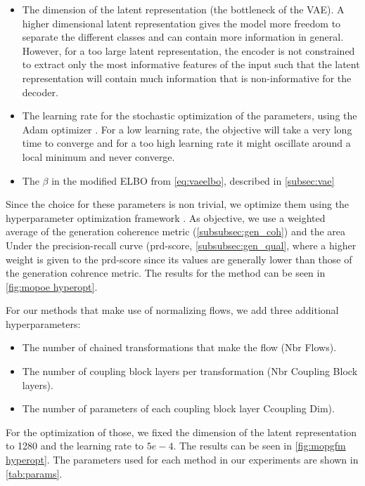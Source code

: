 \begin{itemize}
    \item The dimension of the latent representation (the bottleneck of the VAE).
    A higher dimensional latent representation gives the model more freedom to separate the different classes and can contain more information in general.
    However, for a too large latent representation, the encoder is not constrained to extract only the most informative features of the input such that the latent representation will contain much information that is non-informative for the decoder.
    \item The learning rate for the stochastic optimization of the parameters, using the Adam optimizer \citep{kingma_adam_2017}.
    For a low learning rate, the objective will take a very long time to converge and for a too high learning rate it might oscillate around a local minimum and never converge.
    \item The $\beta$ in the modified ELBO from \cref{eq:vaeelbo}, described in \cref{subsec:vae}
\end{itemize}

Since the choice for these parameters is non trivial, we optimize them using the hyperparameter optimization framework  \citep{akiba_optuna_2019}.
As objective, we use a weighted average of the generation coherence metric (\cref{subsubsec:gen_coh}) and the area Under the precision-recall curve (prd-score, \cref{subsubsec:gen_qual}, where a higher weight is given to the prd-score since its values are generally lower than those of the generation cohrence metric.
The results for the  method can be seen in \cref{fig:mopoe hyperopt}.

For our methods that make use of normalizing flows, we add three additional hyperparameters:
\begin{itemize}
    \item The number of chained transformations that make the flow (Nbr Flows).
    \item The number of coupling block layers per transformation (Nbr Coupling Block layers).
    \item The number of parameters of each coupling block layer Ccoupling Dim).
\end{itemize}

For the optimization of those, we fixed the dimension of the latent representation to 1280 and the learning rate to $5e-4$.
The results can be seen in \cref{fig:mopgfm hyperopt}.
The parameters used for each method in our experiments are shown in \cref{tab:params}.


